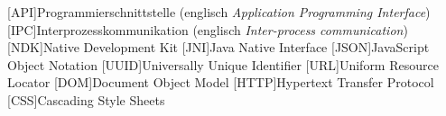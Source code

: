 
\begin{acronym}
  [API]{Programmierschnittstelle (englisch \textit{Application Programming Interface})}
  [IPC]{Interprozesskommunikation (englisch \textit{Inter-process communication})}
  [NDK]{Native Development Kit}
  [JNI]{Java Native Interface}
  [JSON]{JavaScript Object Notation}
  [UUID]{Universally Unique Identifier}
  [URL]{Uniform Resource Locator}
  [DOM]{Document Object Model}
  [HTTP]{Hypertext Transfer Protocol}
  [CSS]{Cascading Style Sheets}
\end{acronym}